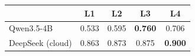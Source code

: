 \begin{tabular}{@{}lcccc@{}}
\toprule
 & L1 & L2 & L3 & L4 \\
\midrule
Qwen3.5-4B & 0.533 & 0.595 & \textbf{0.760} & 0.706 \\
\midrule
DeepSeek (cloud) & 0.863 & 0.873 & 0.875 & \textbf{0.900} \\
\bottomrule
\end{tabular}
